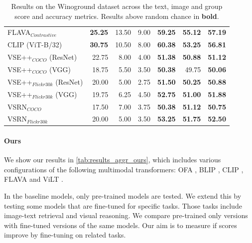 \begin{table}[ht]
\begin{tabular}{l|rrr|rrr}
 FLAVA$_{Contrastive}$        & \textbf{25.25} & 13.50          & 9.00           & \textbf{59.25} & \textbf{55.12} & \textbf{57.19} \\
 CLIP (ViT-B/32)              & \textbf{30.75} & 10.50          & 8.00           & \textbf{60.38} & \textbf{53.25} & \textbf{56.81} \\
 VSE++$_{COCO}$ (ResNet)      & 22.75          & 8.00           & 4.00           & \textbf{51.38} & \textbf{50.88} & \textbf{51.12} \\
 VSE++$_{COCO}$ (VGG)         & 18.75          & 5.50           & 3.50           & \textbf{50.38} & 49.75          & \textbf{50.06} \\
 VSE++$_{Flickr30k}$ (ResNet) & 20.00          & 5.00           & 2.75           & \textbf{51.50} & \textbf{50.25} & \textbf{50.88} \\
 VSE++$_{Flickr30k}$ (VGG)    & 19.75          & 6.25           & 4.50           & \textbf{52.75} & \textbf{51.00} & \textbf{51.88} \\
 VSRN$_{COCO}$                & 17.50          & 7.00           & 3.75           & \textbf{50.38} & \textbf{51.12} & \textbf{50.75} \\
 VSRN$_{Flickr30k}$           & 20.00          & 5.00           & 3.50           & \textbf{53.25} & \textbf{51.75} & \textbf{52.50} \\
\bottomrule
\end{tabular}
\caption{Results on the Winoground dataset across the text, image and group score and accuracy metrics. Results above random chance in \textbf{bold}.}
\label{tab:results_aggr_baseline}
\end{table}

\paragraph{Ours}

We show our results in \cref{tab:results_aggr_ours}, which includes various configurations of the following multimodal transformers: OFA \cite{wang2022unifying}, BLIP \cite{li2022blip}, CLIP \cite{radford2021clip}, FLAVA \cite{singh2022flava} and ViLT \cite{kim2021vilt}.

In the baseline models, only pre-trained models are tested. We extend this by testing some models that are fine-tuned for specific tasks. Those tasks include image-text retrieval and visual reasoning. We compare pre-trained only versions with fine-tuned versions of the same models. Our aim is to measure if scores improve by fine-tuning on related tasks.

